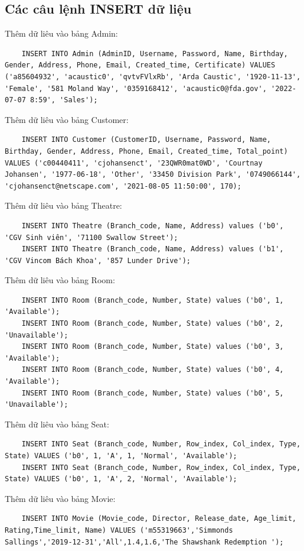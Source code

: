 \subsection{Các câu lệnh INSERT dữ liệu}
Thêm dữ liêu vào bảng Admin:
\begin{verbatim}
    INSERT INTO Admin (AdminID, Username, Password, Name, Birthday, Gender, Address, Phone, Email, Created_time, Certificate) VALUES ('a85604932', 'acaustic0', 'qvtvFVlxRb', 'Arda Caustic', '1920-11-13', 'Female', '581 Moland Way', '0359168412', 'acaustic0@fda.gov', '2022-07-07 8:59', 'Sales');
\end{verbatim}
Thêm dữ liêu vào bảng Customer:
\begin{verbatim}
    INSERT INTO Customer (CustomerID, Username, Password, Name, Birthday, Gender, Address, Phone, Email, Created_time, Total_point) VALUES ('c00440411', 'cjohansenct', '23QWR0mat0WD', 'Courtnay Johansen', '1977-06-18', 'Other', '33450 Division Park', '0749066144', 'cjohansenct@netscape.com', '2021-08-05 11:50:00', 170);
\end{verbatim}
Thêm dữ liêu vào bảng Theatre:
\begin{verbatim}
    INSERT INTO Theatre (Branch_code, Name, Address) values ('b0', 'CGV Sinh viên', '71100 Swallow Street');
    INSERT INTO Theatre (Branch_code, Name, Address) values ('b1', 'CGV Vincom Bách Khoa', '857 Lunder Drive');
\end{verbatim}
Thêm dữ liêu vào bảng Room:
\begin{verbatim}
    INSERT INTO Room (Branch_code, Number, State) values ('b0', 1, 'Available');
    INSERT INTO Room (Branch_code, Number, State) values ('b0', 2, 'Unavailable');
    INSERT INTO Room (Branch_code, Number, State) values ('b0', 3, 'Available');
    INSERT INTO Room (Branch_code, Number, State) values ('b0', 4, 'Available');
    INSERT INTO Room (Branch_code, Number, State) values ('b0', 5, 'Unavailable');
\end{verbatim}
Thêm dữ liêu vào bảng Seat:
\begin{verbatim}
    INSERT INTO Seat (Branch_code, Number, Row_index, Col_index, Type, State) VALUES ('b0', 1, 'A', 1, 'Normal', 'Available');
    INSERT INTO Seat (Branch_code, Number, Row_index, Col_index, Type, State) VALUES ('b0', 1, 'A', 2, 'Normal', 'Available');
\end{verbatim}
Thêm dữ liêu vào bảng Movie:
\begin{verbatim}
    INSERT INTO Movie (Movie_code, Director, Release_date, Age_limit, Rating,Time_limit, Name) VALUES ('m55319663','Simmonds Sallings','2019-12-31','All',1.4,1.6,'The Shawshank Redemption ');
\end{verbatim}
